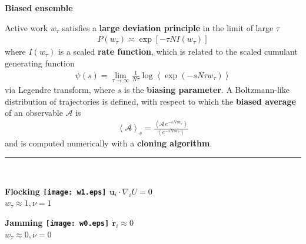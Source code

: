 \documentclass[25pt, a0paper, portrait, innermargin=1.0cm, blockverticalspace=-5mm]{tikzposter}
\renewcommand\paragraph[1]{
\begin{center}
  {\bf\color{CaRed} #1}
\end{center}}
\begin{document}
\begin{columns}
{\begin{multicols}{2}
\vfill\null
\columnbreak
\paragraph{Biased ensemble}

Active work $w_{\tau}$ satisfies a \textbf{large deviation principle} in the limit of large $\tau$
\begin{align*}
P(w_{\tau}) \asymp \exp[-\tau N I(w_{\tau})]
\end{align*}
where $I(w_{\tau})$ is a scaled \textbf{rate function}, which is related to the scaled cumulant generating function
\begin{align*}
\psi(s) = \lim_{\tau \to \infty} \frac{1}{N \tau} \log \left\langle \exp\left(- s N \tau w_{\tau} \right) \right\rangle
\end{align*}
via Legendre transform, where $s$ is the \textbf{biasing parameter}. A Boltzmann-like distribution of trajectories is defined, with respect to which the \textbf{biased average} of an observable $\mathcal{A}$ is
\begin{align*}
\left\langle\mathcal{A}\right\rangle_s = \frac{\left\langle\mathcal{A} \, e^{-s N \tau w_{\tau}}\right\rangle}{\left\langle e^{-s N \tau w_{\tau}} \right\rangle}
\end{align*}
and is computed numerically with a \textbf{cloning algorithm}.\\


\hrule
\mbox{}\\

\begin{minipage}{0.49\linewidth}
\centering
\bf Flocking
\texttt{[image: w1.eps]}
$\bm{u}_i \cdot \nabla_i U = 0$\\
$w_{\tau} \approx 1, \nu = 1$
\end{minipage}
\hfill
\begin{minipage}{0.49\linewidth}
\centering
\bf Jamming
\texttt{[image: w0.eps]}
$\dot{\bm{r}}_i \approx 0$\\
$w_{\tau} \approx 0, \nu = 0$
\end{minipage}

\end{multicols}

}
\end{columns}
\end{document}
